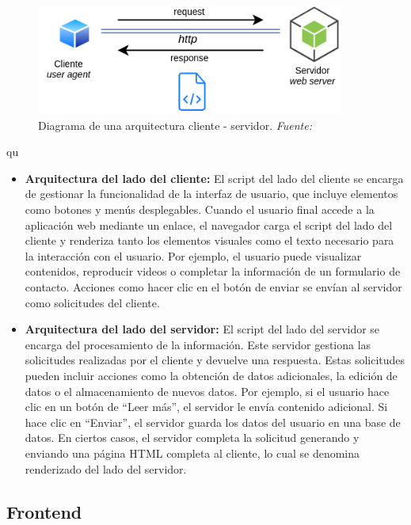 \begin{figure}[h]
	\centering	 
	\includegraphics[width=0.9\textwidth]{img/chapter03/ui-web-arquitectura.png}
	\caption[Diagrama de una arquitectura cliente - servidor]{Diagrama de una arquitectura cliente - servidor. \textit{Fuente: ~\cite{uqbar-wiki-web}}}
	\label{fig:cliente-servidor}  %
\end{figure}qu


\begin{itemize}	
	\item \textbf{Arquitectura del lado del cliente:} El script del lado del cliente se encarga de gestionar la funcionalidad de la interfaz de usuario, que incluye elementos como botones y menús desplegables. Cuando el usuario final accede a la aplicación web mediante un enlace, el navegador carga el script del lado del cliente y renderiza tanto los elementos visuales como el texto necesario para la interacción con el usuario. Por ejemplo, el usuario puede visualizar contenidos, reproducir videos o completar la información de un formulario de contacto. Acciones como hacer clic en el botón de enviar se envían al servidor como solicitudes del cliente.
	
	\item \textbf{Arquitectura del lado del servidor:} El script del lado del servidor se encarga del procesamiento de la información. Este servidor gestiona las solicitudes realizadas por el cliente y devuelve una respuesta. Estas solicitudes pueden incluir acciones como la obtención de datos adicionales, la edición de datos o el almacenamiento de nuevos datos. Por ejemplo, si el usuario hace clic en un botón de “Leer más”, el servidor le envía contenido adicional. Si hace clic en “Enviar”, el servidor guarda los datos del usuario en una base de datos. En ciertos casos, el servidor completa la solicitud generando y enviando una página HTML completa al cliente, lo cual se denomina renderizado del lado del servidor.
\end{itemize}


\subsection{Frontend}


